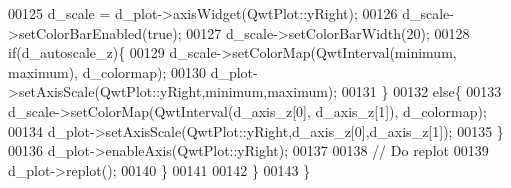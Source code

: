\begin{DoxyCode}
00125             d_scale = d_plot->axisWidget(QwtPlot::yRight);
00126             d_scale->setColorBarEnabled(\textcolor{keyword}{true});
00127             d_scale->setColorBarWidth(20);
00128             \textcolor{keywordflow}{if}(d_autoscale_z)\{
00129                 d_scale->setColorMap(QwtInterval(minimum, maximum), d_colormap);
00130                 d_plot->setAxisScale(QwtPlot::yRight,minimum,maximum);
00131             \}
00132             \textcolor{keywordflow}{else}\{
00133                 d_scale->setColorMap(QwtInterval(d_axis_z[0], d_axis_z[1]), 
      d_colormap);
00134                 d_plot->setAxisScale(QwtPlot::yRight,d_axis_z[0],d_axis_z[1]);
00135             \}
00136             d_plot->enableAxis(QwtPlot::yRight);
00137             
00138             \textcolor{comment}{// Do replot}
00139             d_plot->replot();
00140         \}
00141 
00142     \}
00143 \}
\end{DoxyCode}
